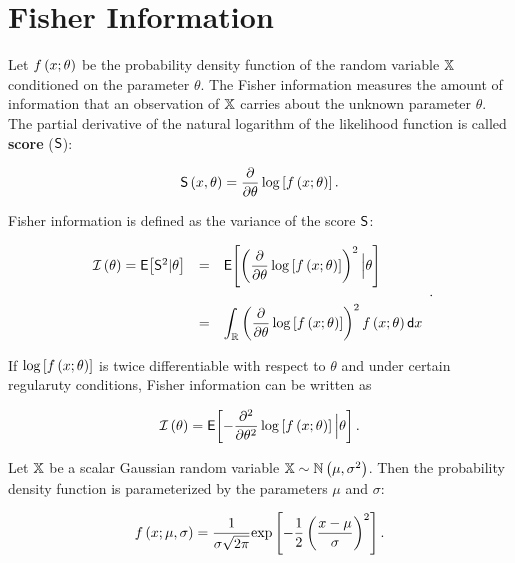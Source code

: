 \section{Fisher Information}


Let $f\left(x ; \theta\right)$ be the probability density function of the random variable $\mathbb{X}$ conditioned on the parameter $\theta$.
The Fisher information measures the amount of information that an observation of $\mathbb{X}$ carries about the unknown parameter $\theta$.
The partial derivative of the natural logarithm of the likelihood function is called \textbf{score} ($\mathsf{S}$):

\begin{equation}
 \mathsf{S}\left( x,\theta \right) = \displaystyle\frac{\partial{}}{\partial{\theta}}\log\left[ f\left(x ; \theta\right) \right].
 \label{score}
\end{equation}

\noindent Fisher information is defined as the variance of the score $\mathsf{S}$:

\begin{equation}
 \begin{array}{rcl}
 \mathcal{I}\left(\theta\right) = \mathsf{E}\!\left[\mathsf{S}^2 | \theta\right] &=& \mathsf{E}\!\left[\left( \displaystyle\frac{\partial{}}{\partial{\theta}}\log\left[ f\left(x ; \theta\right) \right]\right)^2  \Big| \theta\right]\\ \\
 &=& \displaystyle\int_{\mathbb{R}} \left( \displaystyle\frac{\partial{}}{\partial{\theta}}\log\left[ f\left(x ; \theta\right) \right] \right)^2 f\left(x ; \theta\right) \mathsf{d}x
 \end{array}.
 \label{FI}
\end{equation}

If $\log\left[ f\left(x ; \theta\right) \right]$ is twice differentiable with respect to $\theta$ and under certain regularuty conditions, Fisher information can be written as

\begin{equation}
 \mathcal{I}\left(\theta\right) = \mathsf{E}\!\left[ -\displaystyle\frac{\partial^{2}{}}{\partial{\theta}^{2}}\log\left[ f\left(x ; \theta\right) \right]  \Big| \theta\right].
 \label{FI2}
\end{equation}

Let $\mathbb{X}$ be a scalar Gaussian random variable \ie $\mathbb{X}\sim \mathbb{N}\left(\mu,\sigma^2\right)$.
Then the probability density function is parameterized by the parameters $\mu$ and $\sigma$:

\begin{equation}
 f\left(x ; \mu,\sigma\right) = \dfrac{1}{\sigma\sqrt{2\pi}}\mbox{exp}\left[ -\dfrac{1}{2} \left( \dfrac{x - \mu}{\sigma}  \right)^2  \right].
 \label{pdfnormal}
\end{equation}

